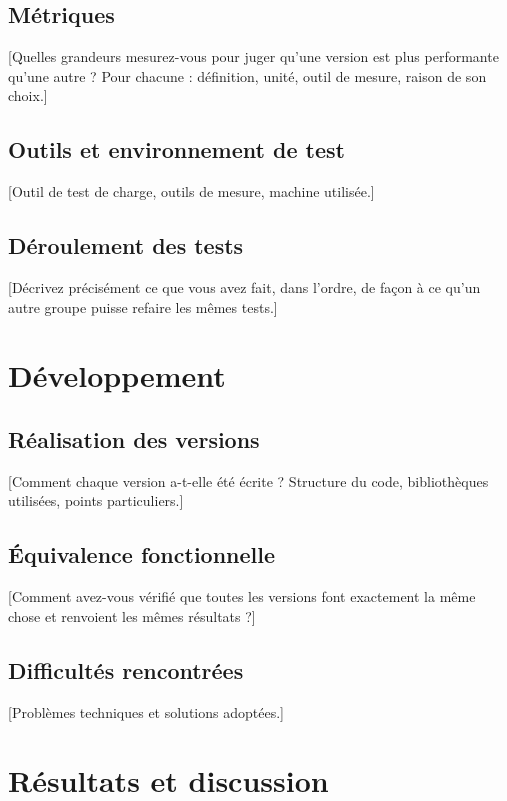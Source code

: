 \documentclass[conference,a4paper]{IEEEtran}
\begin{document}
\subsection{Métriques}
[Quelles grandeurs mesurez-vous pour juger qu'une version est plus
performante qu'une autre ? Pour chacune : définition, unité, outil de
mesure, raison de son choix.]

\subsection{Outils et environnement de test}
[Outil de test de charge, outils de mesure, machine utilisée.]

\subsection{Déroulement des tests}
[Décrivez précisément ce que vous avez fait, dans l'ordre, de façon à
ce qu'un autre groupe puisse refaire les mêmes tests.]

\section{Développement}
\subsection{Réalisation des versions}
[Comment chaque version a-t-elle été écrite ? Structure du code,
bibliothèques utilisées, points particuliers.]

\subsection{Équivalence fonctionnelle}
[Comment avez-vous vérifié que toutes les versions font exactement la
même chose et renvoient les mêmes résultats ?]

\subsection{Difficultés rencontrées}
[Problèmes techniques et solutions adoptées.]

\section{Résultats et discussion}
\end{document}
